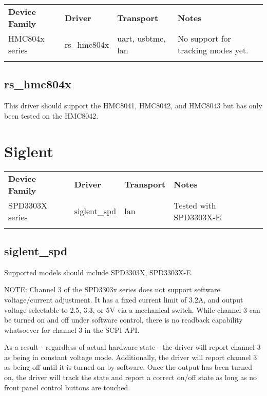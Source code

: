 \begin{tabularx}{16cm}{lllX}
\thickhline
\textbf{Device Family} & \textbf{Driver} & \textbf{Transport} & \textbf{Notes} \\
\thickhline
HMC804x series & rs\_hmc804x & uart, usbtmc, lan & No support for tracking modes yet.\\
\thickhline
\end{tabularx}

\subsection{rs\_hmc804x}

This driver should support the HMC8041, HMC8042, and HMC8043 but has only been tested on the HMC8042.

\section{Siglent}

\begin{tabularx}{16cm}{lllX}
\thickhline
\textbf{Device Family} & \textbf{Driver} & \textbf{Transport} & \textbf{Notes} \\
\thickhline
SPD3303X series & siglent\_spd & lan & Tested with SPD3303X-E\\
\thickhline
\end{tabularx}

\subsection{siglent\_spd}

Supported models should include SPD3303X, SPD3303X-E.

NOTE: Channel 3 of the SPD3303x series does not support software voltage/current adjustment. It has a fixed current
limit of 3.2A, and output voltage selectable to 2.5, 3.3, or 5V via a mechanical switch. While channel 3 can be turned
on and off under software control, there is no readback capability whatsoever for channel 3 in the SCPI API.

As a result - regardless of actual hardware state - the driver will report channel 3 as being in constant voltage mode.
Additionally, the driver will report channel 3 as being off until it is turned on by software. Once the output has been
turned on, the driver will track the state and report a correct on/off state as long as no front panel control buttons
are touched.
